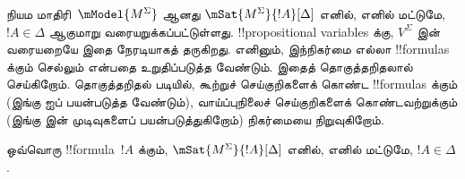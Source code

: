 \documentclass[../../../include/open-logic-section]{subfiles}
\begin{document}


நியம மாதிரி~$\mModel{M^\Sigma}$ ஆனது $\mSat{M^\Sigma}{!A}[\Delta]$
எனில், எனில் மட்டுமே, $!A \in \Delta$ ஆகுமாறு வரையறுக்கப்பட்டுள்ளது.
!!{propositional variable}s க்கு, $V^\Sigma$ இன் வரையறையே இதை நேரடியாகத்
தருகிறது. எனினும், இந்நிகர்மை எல்லா !!{formula}s க்கும் செல்லும் என்பதை
உறுதிப்படுத்த வேண்டும். இதைத் தொகுத்தறிதலால் செய்கிறோம். தொகுத்தறிதல் படியில்,
கூற்றுச் செய்குறிகளைக் கொண்ட !!{formula}s க்கும் (இங்கு
 ஐப் பயன்படுத்த வேண்டும்), வாய்ப்புநிலைச்
செய்குறிகளைக் கொண்டவற்றுக்கும் (இங்கு  இன் முடிவுகளைப்
பயன்படுத்துகிறோம்) நிகர்மையை நிறுவுகிறோம்.

\begin{prop}[மெய்மை துணைத்தேற்றம்]
  ஒவ்வொரு !!{formula}~$!A$ க்கும், $\mSat{M^\Sigma}{!A}[\Delta]$ எனில்,
  எனில் மட்டுமே, $!A \in \Delta$.
\end{prop}
\end{document}
